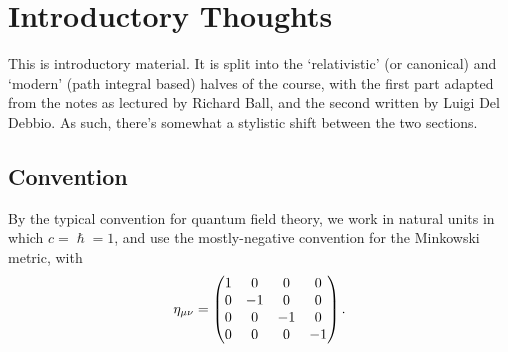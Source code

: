 \documentclass[notes]{subfiles}
\begin{document}
\chapter*{Introductory Thoughts}
\label{chap:intro}
This is introductory material. It is split into the `relativistic' (or canonical) and `modern' (path integral based) halves of the course, with the first part adapted from the notes as lectured by Richard Ball, and the second written by Luigi Del Debbio.
As such, there's somewhat a stylistic shift between the two sections.

\section*{Convention}
By the typical convention for quantum field theory, we work in natural units in which $c = \hslash = 1$, and use the mostly-negative convention for the Minkowski metric, with 
\begin{equation*}
    \eta_{\mu\nu} = \begin{pmatrix}
        \dmat[0]{1, -1, -1, -1}
    \end{pmatrix}.
\end{equation*}
\end{document}
